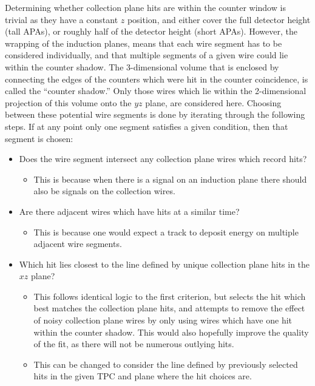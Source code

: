 Determining whether collection plane hits are within the counter window is trivial as they have a constant $z$ position, and either cover the full detector height (tall APAs), or roughly half of the detector height (short APAs). However, the wrapping of the induction planes, means that each wire segment has to be considered individually, and that multiple segments of a given wire could lie within the counter shadow. The 3-dimensional volume that is enclosed by connecting the edges of the counters which were hit in the counter coincidence, is called the ``counter shadow.'' Only those wires which lie within the 2-dimensional projection of this volume onto the $yz$ plane, are considered here. Choosing between these potential wire segments is done by iterating through the following steps. If at any point only one segment satisfies a given condition, then that segment is chosen:
\begin{itemize}
\item Does the wire segment intersect any collection plane wires which record hits?
  \begin{itemize}
  \item This is because when there is a signal on an induction plane there should also be signals on the collection wires.
  \end{itemize}
\item Are there adjacent wires which have hits at a similar time?
  \begin{itemize}
  \item This is because one would expect a track to deposit energy on multiple adjacent wire segments. 
  \end{itemize}
\item Which hit lies closest to the line defined by unique collection plane hits in the $xz$ plane?
  \begin{itemize}
  \item This follows identical logic to the first criterion, but selects the hit which best matches the collection plane hits, and attempts to remove the effect of noisy collection plane wires by only using wires which have one hit within the counter shadow. This would also hopefully improve the quality of the fit, as there will not be numerous outlying hits.
  \item This can be changed to consider the line defined by previously selected hits in the given TPC and plane where the hit choices are.
  \end{itemize}
\end{itemize}

